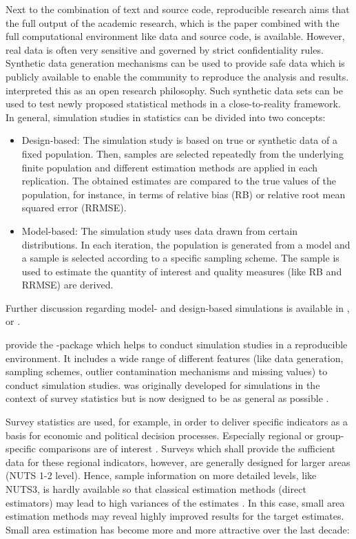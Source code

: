\documentclass[article]{ajs}
\begin{document}
Next to the combination of text and source code, reproducible research aims that the full output of the academic research, which is the paper combined with the full computational environment like data and source code, is available. However, real data is often very sensitive and governed by strict confidentiality rules. Synthetic data generation mechanisms \citep{Kol11} can be used to provide safe data which is publicly available to enable the community to reproduce the analysis and results. \cite{Bur14} interpreted this as an open research philosophy. Such synthetic data sets can be used to test newly proposed statistical methods in a close-to-reality framework. 
In general, simulation studies in statistics can be divided into two concepts:
%
\begin{itemize}
\item Design-based: The simulation study is based on true or synthetic data of a fixed population. Then, samples are selected repeatedly from the underlying finite population and different estimation methods are applied in each replication. The obtained estimates are compared to the true values of the population, for instance, in terms of relative bias (RB) or relative root mean squared error (RRMSE).
\item Model-based: The simulation study uses data drawn from certain distributions. In each iteration, the population is generated from a model and a sample is selected according to a specific sampling scheme. The sample is used to estimate the quantity of interest and quality measures (like RB and RRMSE) are derived.  
\end{itemize}
Further discussion regarding model- and design-based simulations is available in \cite{Mue03}, \cite{Sal10} or \cite{Alf10}.

\cite{Alf10} provide the -package  which helps to conduct simulation studies in a reproducible environment. It includes a wide range of different features (like data generation, sampling schemes, outlier contamination mechanisms and missing values) to conduct simulation studies.  was originally developed for simulations in the context of survey statistics but is now designed to be as general as possible \citep[cf.][]{Alf10}.

Survey statistics are used, for example, in order to deliver specific indicators as a basis for economic and political decision processes. Especially regional or group-specific comparisons are of interest \citep[cf.][]{Sch13}. Surveys which shall provide the sufficient data for these regional indicators, however, are generally designed for larger areas (NUTS 1-2 level). Hence, sample information on more detailed levels, like NUTS3, is hardly available so that classical estimation methods (direct estimators) may lead to high variances of the estimates \citep[cf.][]{Gho94}. In this case, small area estimation methods may reveal highly improved results for the target estimates. Small area estimation has become more and more attractive over the last decade: 
\end{document}
